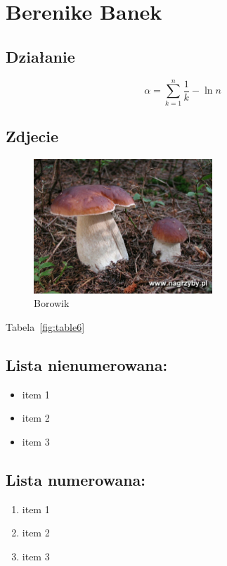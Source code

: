\section{Berenike Banek}

\subsection{Działanie}

\begin{displaymath} 
    \alpha = \sum_{k=1}^{n} \frac{1}{k} - \ln{n}
    \label{fig:equation}
\end{displaymath}

\subsection{Zdjecie}
\begin{figure} [h!]
\includegraphics[width=0.6\textwidth]{pictures/grzyb.jpg}
\caption{Borowik}
\label{fig:mushroom}
\end{figure}

Tabela~\ref{fig:table6}
 

\subsection{Lista nienumerowana:}
\begin{itemize}
  \item item 1
  \item item 2
  \item item 3
\end{itemize}

\subsection{Lista numerowana:}
\begin{enumerate}
  \item item 1
  \item item 2
  \item item 3
\end{enumerate}

